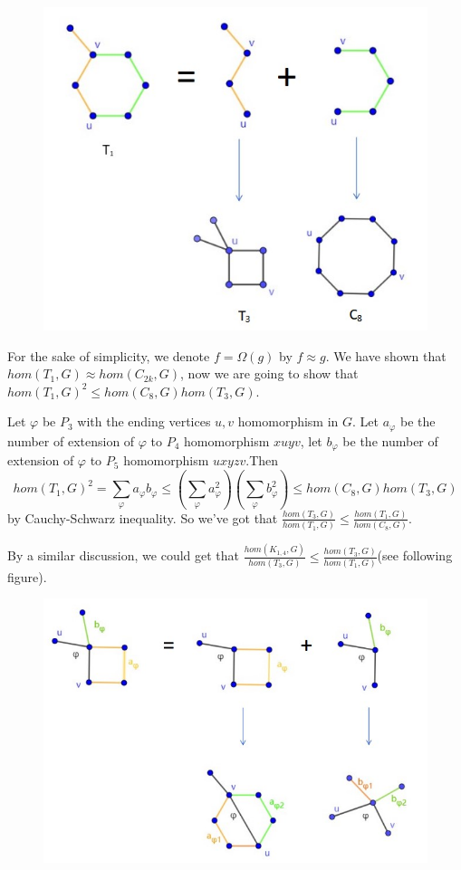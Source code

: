 \documentclass{article}
\theoremstyle{definition}
\begin{document}
\begin{figure}[H]
     \centering
     \includegraphics[scale=0.35]{12-1.jpg}
\end{figure}

For the sake of simplicity, we denote $f=\Omega(g)$ by $f\approx g$. We have shown that $hom(T_1,G)\approx hom(C_{2k},G)$, now we are going to show that $hom(T_1,G)^2 \le hom(C_8,G)hom(T_3,G)$.

Let $\varphi$ be $P_3$ with the ending vertices $u,v$ homomorphism in $G$. Let $a_\varphi$ be the number of extension of $\varphi$ to $P_4$ homomorphism $xuyv$, let $b_\varphi$ be the number of extension of $\varphi$ to $P_5$ homomorphism $uxyzv$.Then
$$hom(T_1,G)^2=\sum_{\varphi}a_{\varphi}b_{\varphi}\le (\sum_{\varphi}a_{\varphi}^2)(\sum_{\varphi}b_{\varphi}^2)\le hom(C_8,G)hom(T_3,G)$$ by Cauchy-Schwarz inequality. So we've got that 
$\frac{hom(T_3,G)}{hom(T_1,G)}\le \frac{hom(T_1,G)}{hom(C_8,G)}$.

By a similar discussion, we could get that $\frac{hom(K_{1,4},G)}{hom(T_3,G)}\le \frac{hom(T_3,G)}{hom(T_1,G)}$(see following figure).

\begin{figure}[H]
     \centering
     \includegraphics[scale=0.35]{12-2.jpg}
\end{figure}
\end{document}
